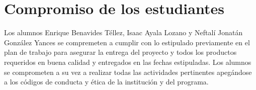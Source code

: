 \section{Compromiso de los estudiantes}

Los alumnos Enrique Benavides Téllez, Isaac Ayala Lozano y Neftalí Jonatán 
González Yances se compremeten a cumplir con lo estipulado previamente en el 
plan de trabajo para asegurar la entrega del proyecto y todos los productos 
requeridos en buena calidad y entregados en las fechas estipuladas. 
Los alumnos se comprometen a su vez a realizar todas las actividades 
pertinentes apegándose a los códigos de conducta y ética de la institución y 
del programa.


